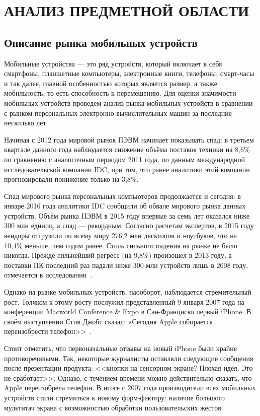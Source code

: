 \section[Анализ предметной области]{%
  АНАЛИЗ ПРЕДМЕТНОЙ ОБЛАСТИ
}\label{sec:spec}


\subsection{Описание рынка мобильных устройств}

Мобильные устройства --- это ряд устройств, который включает в себя смартфоны,
планшетные компьютеры, электронные книги, телефоны, смарт-часы и так далее,
главной особенностью которых является размер, а также мобильность,
то есть способность к перемещению.
Для оценки значимости мобильных устройств проведем анализ рынка мобильных
устройств в сравнении с рынком персональных электронно-вычислительных машин
за последние несколько лет.

Начиная с 2012 года мировой рынок ПЭВМ начинает показывать спад:
в третьем квартале данного года наблюдается снижение объёма
поставок техники на 8,6\% по сравнению с аналогичным периодом
2011 года, по данным международной исследовательской компании IDC, при том,
что ранее аналитики этой компании прогнозировали понижение только на 3,8\%.

Спад мирового рынка персональных компьютеров продолжается и сегодня: в январе 2016
года аналитики IDC сообщили об обвале мирового рынка данных устройств.
Объём рынка ПЭВМ в 2015 году впервые за семь лет оказался ниже 300 млн единиц,
а спад --- рекордным. Согласно расчетам экспертов, в 2015 году вендоры отгрузили
по всему миру 276,2 млн десктопов и ноутбуков, что на 10,4\% меньше, чем годом ранее.
Столь сильного падения на рынке не было никогда.
Прежде сильнейший регресс (на 9,8\%) произошел в 2013 году, а поставки ПК последний
раз падали ниже 300 млн устройств лишь в 2008 году,
отмечается в исследовании~\cite{computers_world_market}.

Однако на рынке мобильных устройств, наооборот, наблюдается стремительный рост.
Толчком к этому росту послужил представленный 9 января 2007 года на конференции
Macworld Conference \& Expo в Сан-Франциско первый iPhone. В своём выступлении
Стив Джобс сказал: «Сегодня Apple собирается переизобрести телефон>>~\cite{apple_reinvent_phone}.

Стоит отметить, что первоначальные отзывы на новый iPhone были крайне противоречивыми.
Так, некоторые журналисты оставляли следующие сообщения после презентации продукта:
<<кнопки на сенсорном экране? Плохая идея. Это не сработает>>.
Однако, с течением времени можно действительно сказать, что Apple
переизобрела телефон.
В итоге с 2007 года производители всех мобильных устройств
стали стремиться к новому форм-фактору: наличие большого мультитач экрана
с возможностью обработки пользовательских жестов.

